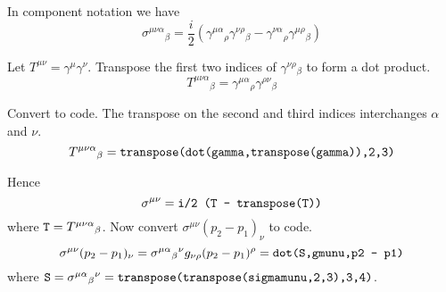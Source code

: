 \documentclass[12pt]{article}
\begin{document}
In component notation we have
$$
\sigma^{\mu\nu\alpha}{}_\beta
=\frac{i}{2}\left(\gamma^{\mu\alpha}{}_\rho\gamma^{\nu\rho}{}_\beta
-\gamma^{\nu\alpha}{}_\rho\gamma^{\mu\rho}{}_\beta\right)
$$

Let $T^{\mu\nu}=\gamma^\mu\gamma^\nu$.
Transpose the first two indices of $\gamma^{\nu\rho}{}_\beta$ to form a dot product.
$$
T^{\mu\nu\alpha}{}_\beta
=\gamma^{\mu\alpha}{}_\rho\gamma^{\rho\nu}{}_\beta
$$

Convert to code.
The transpose on the second and third indices interchanges $\alpha$ and $\nu$.
\begin{equation*}
T^{\mu\nu\alpha}{}_\beta
=\text{\tt transpose(dot(gamma,transpose(gamma)),2,3)}
\end{equation*}

Hence
\begin{equation*}
\sigma^{\mu\nu}=\text{\tt i/2 (T - transpose(T))}
\end{equation*}
where $\text{\tt T}=T^{\mu\nu\alpha}{}_\beta$.
Now convert $\sigma^{\mu\nu}(p_2-p_1)_\nu$ to code.
$$
\sigma^{\mu\nu}(p_2-p_1)_\nu
=\sigma^{\mu\alpha}{}_\beta{}^{\nu}g_{\nu\rho}(p_2-p_1)^\rho
=\text{\tt dot(S,gmunu,p2 - p1)}
$$
where $\text{\tt S}=\sigma^{\mu\alpha}{}_\beta{}^\nu
=\text{\tt transpose(transpose(sigmamunu,2,3),3,4)}$.
\end{document}
